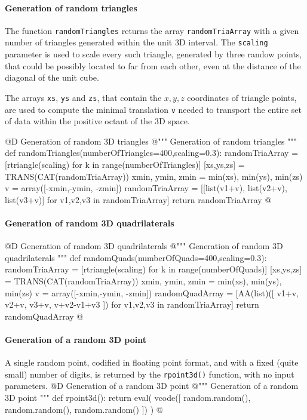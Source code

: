 \documentclass[11pt,oneside]{article}    %
\begin{document}
\paragraph{Generation of random triangles}
The function \texttt{randomTriangles} returns the array \texttt{randomTriaArray} with a given number of triangles generated within the unit 3D interval. The \texttt{scaling} parameter is used to scale every such triangle, generated by three randow points, that could be possibly located to far from each other, even at the distance of the diagonal of the unit cube.

The arrays \texttt{xs}, \texttt{ys} and \texttt{zs}, that contain the $x,y,z$ coordinates of triangle points, are used to compute the minimal translation \texttt{v} needed to transport the entire set of data within the positive octant of the 3D space. 

@D Generation of random 3D triangles
@{""" Generation of random triangles """
def randomTriangles(numberOfTriangles=400,scaling=0.3):
    randomTriaArray = [rtriangle(scaling) for k in range(numberOfTriangles)]
    [xs,ys,zs] = TRANS(CAT(randomTriaArray))
    xmin, ymin, zmin = min(xs), min(ys), min(zs)
    v = array([-xmin,-ymin, -zmin])
    randomTriaArray = [[list(v1+v), list(v2+v), list(v3+v)] for v1,v2,v3 in randomTriaArray]
    return randomTriaArray
@}

\paragraph{Generation of random 3D quadrilaterals}

@D Generation of random 3D quadrilaterals
@{""" Generation of random 3D quadrilaterals """
def randomQuads(numberOfQuads=400,scaling=0.3):
    randomTriaArray = [rtriangle(scaling) for k in range(numberOfQuads)]
    [xs,ys,zs] = TRANS(CAT(randomTriaArray))
    xmin, ymin, zmin = min(xs), min(ys), min(zs)
    v = array([-xmin,-ymin, -zmin])
    randomQuadArray = [AA(list)([ v1+v, v2+v, v3+v, v+v2-v1+v3 ]) for v1,v2,v3 in randomTriaArray]
    return randomQuadArray
@}


\paragraph{Generation of a random 3D point}
A single random point, codified in floating point format, and with a fixed (quite small) number of digits, is returned by the \texttt{rpoint3d()} function, with no input parameters.
@D Generation of a random 3D point
@{""" Generation of a random 3D point """
def rpoint3d():
    return eval( vcode([ random.random(), random.random(), random.random() ]) )
@}
    
\end{document}
